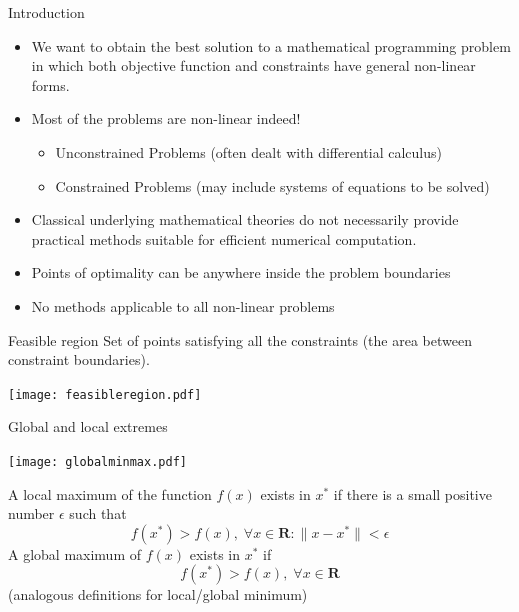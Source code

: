 \documentclass[c]{beamer}
\begin{document}
\begin{frame}{Introduction}

\begin{itemize}
  \item We want to obtain the best solution to a mathematical programming problem in which both  objective function and constraints have general non-linear forms.

  \item Most of the problems are non-linear indeed!

  \begin{itemize}
    \item Unconstrained Problems (often dealt with differential calculus)
    \item Constrained Problems (may include systems of equations to be solved)
  \end{itemize}

  \item Classical underlying mathematical theories do not necessarily provide practical methods suitable for efficient numerical computation.

  \item Points of optimality can be anywhere inside the problem boundaries

  \item No methods applicable to all non-linear problems
\end{itemize}
\end{frame}
\begin{frame}

 \begin{block}{Feasible region}
   Set of points satisfying all the constraints (the area between constraint boundaries).
 \end{block}

 \begin{center}
  \texttt{[image: feasibleregion.pdf]}
 \end{center}

\end{frame}

\begin{frame}[t]{Global and local extremes}
  \begin{center}
    \texttt{[image: globalminmax.pdf]}
  \end{center}

  A local maximum of the function $f(x)$ exists in $x^*$ if there is a small positive number $\epsilon$ such that
  \[
    f(x^*)>f(x), \; \forall x\in\mathbf{R} : \|x-x^*\| < \epsilon
  \]
  A global maximum of $f(x)$ exists in $x^*$ if
  \[
    f(x^*) > f(x), \; \forall x\in\mathbf{R}
  \]
  (analogous definitions for local/global minimum)
\end{frame}
\end{document}
